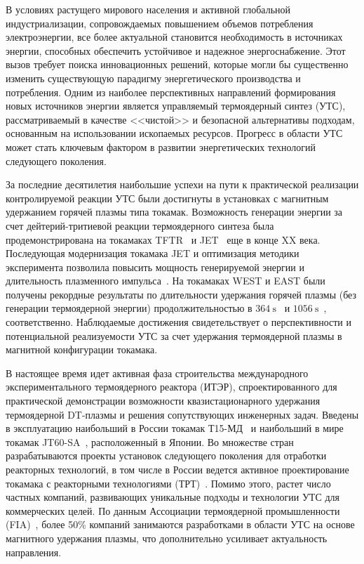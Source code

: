 
{\actuality} В условиях растущего мирового населения и активной глобальной индустриализации, сопровождаемых повышением объемов потребления электроэнергии,
все более актуальной становится необходимость в источниках энергии, способных обеспечить устойчивое и надежное энергоснабжение. Этот вызов требует поиска инновационных решений, которые могли бы существенно изменить существующую парадигму энергетического производства и потребления. Одним из наиболее перспективных направлений формирования новых источников энергии является управляемый термоядерный синтез (УТС), рассматриваемый в качестве <<чистой>> и безопасной альтернативы подходам, основанным на использовании ископаемых ресурсов. Прогресс в области УТС может стать ключевым фактором в развитии энергетических технологий следующего поколения.

За последние десятилетия наибольшие успехи на пути к практической реализации контролируемой реакции УТС были достигнуты в установках с магнитным удержанием горячей плазмы типа токамак. Возможность генерации энергии за счет дейтерий-тритиевой реакции термоядерного синтеза была продемонстрирована на токамаках TFTR~\cite{Skinner1997} и JET~\cite{Keilhacker1999} еще в конце XX века. Последующая модернизация токамака JET и оптимизация методики эксперимента позволила повысить мощность генерируемой энергии и длительность плазменного импульса~\cite{Maggi2024,Kappatou2025}. На токамаках WEST и EAST были получены рекордные результаты по длительности удержания горячей плазмы (без генерации термоядерной энергии) продолжительностью в \(\SI{364}{\second}\)~\cite{Shi2025} и \(\SI{1056}{\second}\)~\cite{Gong2024}, соответственно. Наблюдаемые достижения свидетельствует о перспективности и потенциальной реализуемости УТС за счет удержания термоядерной плазмы в магнитной конфигурации токамака.

В настоящее время идет активная фаза строительства международного экспериментального термоядерного реактора (ИТЭР), спроектированного для практической демонстрации возможности квазистационарного удержания термоядерной DT-плазмы и решения сопутствующих инженерных задач. Введены в эксплуатацию наибольший в России токамак Т15-МД~\cite{Velikhov2024} и наибольший в мире токамак JT60-SA~\cite{Shirai2024}, расположенный в Японии. Во множестве стран разрабатываются проекты установок следующего поколения для отработки реакторных технологий, в том числе в России ведется активное проектирование токамака с реакторными технологиями (ТРТ)~\cite{Krasilnikov2021}. Помимо этого, растет число частных компаний, развивающих уникальные подходы и технологии УТС для коммерческих целей. По данным Ассоциации термоядерной промышленности (FIA)~\cite{FIA}, более 50\% компаний занимаются разработками в области УТС на основе магнитного удержания плазмы, что дополнительно усиливает актуальность направления.

